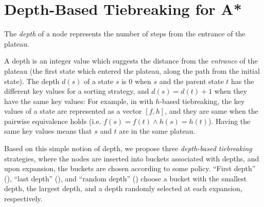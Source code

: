 % 
% 
% 
% 
% 


\section{Depth-Based Tiebreaking for A*}

\label{sec:depth}

The \emph{depth} of a node represents the number of steps from the
entrance of the plateau.

A depth is an integer value which suggests the distance from the
\emph{entrance} of the plateau (the first state which entered the
plateau, along the path from the initial state). The depth $d(s)$ of a
state $s$ is 0 when $s$ and the parent state $t$ has the different key
values for a sorting strategy, and $d(s)=d(t)+1$ when they have the same
key values: For example, in \astar with $h$-based tiebreaking, the key
values of a state are represented as a vector $[f,h]$, and they are same
when the pairwise equivalence holds (i.e. $f(s) = f(t) \land h(s) =
h(t)$).  Having the same key values means that $s$ and $t$ are in the
same plateau. 




Based on this
simple notion of depth, we propose three \emph{depth-based
tiebreaking} strategies, where the nodes are inserted into buckets associated with
depths, and upon expansion, the buckets are chosen according to some policy.
``First depth'' (\fd), ``last depth'' (\ld), and ``random depth'' (\rd) 
choose a bucket with the smallest depth,
the largest depth, and a depth randomly selected at each expansion, respectively.

